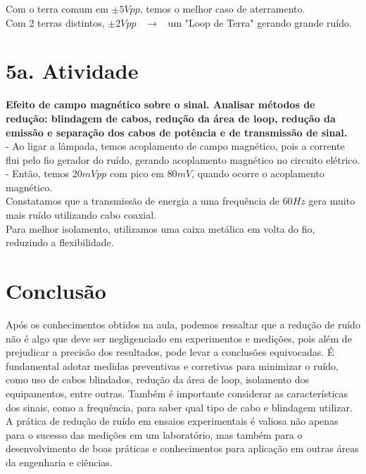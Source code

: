 \documentclass[a4paper, 12pt]{article}
\begin{document}
Com o terra comum em $\pm 5Vpp$, temos o melhor caso de aterramento. \\
Com 2 terras distintos, $\pm 2Vpp$ \>\ $\longrightarrow$ \>\ um "Loop de Terra" gerando grande ruído.


\section*{5a. Atividade}
\textbf{Efeito de campo magnético sobre o sinal. Analisar métodos de redução: blindagem de cabos, redução da
área de loop, redução da emissão e separação dos cabos de potência e de transmissão de sinal.}\\

- Ao ligar a lâmpada, temos acoplamento de campo magnético, pois a corrente flui pelo fio gerador do ruído, gerando acoplamento magnético no circuito elétrico.\\

- Então, temos $20mVpp$ com pico em $80mV$, quando ocorre o acoplamento magnético.\\

Constatamos que a transmissão de energia a uma frequência de  $60Hz$ gera muito mais ruído utilizando cabo coaxial.\\
Para melhor isolamento, utilizamos uma caixa metálica em volta do fio, reduzindo a flexibilidade.

\section*{Conclusão}
Após os conhecimentos obtidos na aula, podemos ressaltar que a redução de ruído não é algo que deve ser negligenciado em experimentos e medições, pois além de prejudicar a precisão dos resultados, pode levar a conclusões equivocadas. É fundamental adotar medidas preventivas e corretivas para minimizar o ruído, como uso de cabos blindados, redução da área de loop, isolamento dos equipamentos, entre outras. Também é importante considerar as características dos sinais, como a frequência, para saber qual tipo de cabo e blindagem utilizar. A prática de redução de ruído em ensaios experimentais é valiosa não apenas para o sucesso das medições em um laboratório, mas também para o desenvolvimento de boas práticas e conhecimentos para aplicação em outras áreas da engenharia e ciências.

\newpage
\end{document}
